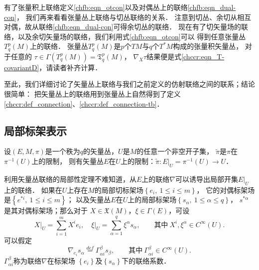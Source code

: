 有了张量积上联络定义\eqref{chfb:eqn_otcon}以及对偶丛上的联络\eqref{chfb:eqn_dual-con}，
我们再来看看张量丛上联络与切丛联络的关系．
注意到切丛、余切从相互对偶，故从联络\eqref{chfb:eqn_dual-con}可得余切丛的联络．
现在有了切矢量场的联络，以及余切矢量场的联络，我们利用式\eqref{chfb:eqn_otcon}可以
得到任意张量丛 $T_q^p(M)$上的联络．
张量丛$T_q^p(M)$是$p$个$TM$与$q$个$T^* M$构成的张量积矢量丛，
对于任意的 $\tau \in \Gamma (T_q^p(M)) =\mathfrak{T}_q^p(M)$，
$\nabla_X \tau$结果便是式\eqref{chccr:eqn_T-covariantD}，请读者补齐计算．


至此，我们详细讨论了矢量丛上联络与我们之前定义的仿射联络之间的联系；结论很简单：
把矢量丛上的联络用到张量丛上自然得到了定义\ref{chccr:def_connection}、\ref{chccr:def_connection-tb}．


\subsection{局部标架表示}\label{chfb:sec_vc}

设$(E,M,\pi)$是一个秩为$q$的矢量丛，$U$是$M$的任意一个非空开子集，
$\tilde{\pi}$是$\pi$在 $\pi^{-1}(U)$上的限制，
则有矢量丛$E$在$U$上的限制：$\tilde{\pi}:\left.E\right|_U=\pi^{-1}(U) \to U$．

利用矢量丛联络的局部性定理不难知道，从$E$上的联络$\nabla$可以诱导出局部开集$\left.E\right|_U$上的联络．
如果在$U$上存在$M$的局部切标架场$\left\{e_i,\ 1 \leqslant i \leqslant m\right\}$，
它的对偶标架场是$\left\{e^{*i},\ 1 \leqslant i \leqslant m\right\}$；
以及矢量丛$E$在$U$上的局部标架场$\left\{s_\alpha,\ 1 \leqslant \alpha \leqslant q\right\}$，
$s^{*\alpha}$是其对偶标架场；那么对于 $X \in \mathfrak{X}(M)$，$ \xi \in \Gamma(E)$，可设
\begin{equation*}
    \left.X\right|_U= \sum_{i=1}^{m}X^i e_i,\left.\quad 
    \xi\right|_U= \sum_{\alpha=1}^{q}\xi^\alpha s_\alpha,
    \qquad \text{其中} \  X^i, \xi^\alpha \in C^{\infty}(U) .
\end{equation*}
可以假定
\begin{equation}\label{chfb:eqn_con-Gamma}
    \nabla_{e_i} s_\alpha \overset{def}{=} \Gamma_{\alpha i}^\beta s_\beta,
    \qquad \text{其中}\  \Gamma_{\alpha i}^\beta \in C^{\infty}(U). 
\end{equation}
$\Gamma_{\alpha i}^\beta$称为联络$\nabla$在标架场
$\left\{e_i\right\}$及$\left\{s_\alpha\right\}$下的{\heiti 联络系数}． 


